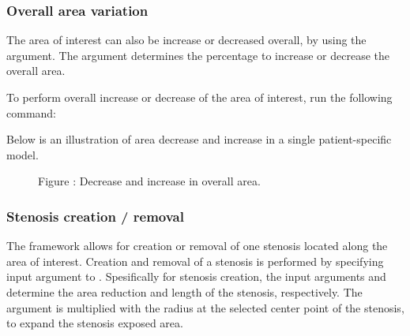 \documentclass[letterpaper,10pt,english]{sphinxmanual}
\begin{document}
\subsubsection{Overall area variation}
\label{\detokenize{getting_started:overall-area-variation}}
The area of interest can also be increase or decreased overall, by using the  argument.
The  argument determines the percentage to increase or decrease the overall area.

To perform overall increase or decrease of the area of interest, run the following command:

%
\begin{sphinxVerbatim}[commandchars=\\\{\}]
   \PYG{p}{[}\PYG{p}{]}  \PYG{p}{[}\PYG{p}{]}    \PYG{p}{[}\PYG{p}{]}
\end{sphinxVerbatim}

Below is an illustration of area decrease and increase in a single patient-specific model.

\begin{figure}[htbp]
\centering
\capstart

\noindent{}
\caption{Figure : Decrease and increase in overall area.}\label{\detokenize{getting_started:id8}}\end{figure}


\subsubsection{Stenosis creation / removal}
\label{\detokenize{getting_started:stenosis-creation-removal}}
The framework allows for creation or removal of one stenosis located along the area of interest.
Creation and removal of a stenosis is performed by specifying input argument  to .
Spesifically for stenosis creation, the input arguments  and  determine the area reduction and length of the stenosis, respectively.
The  argument is multiplied with the radius at the selected center point of the stenosis, to expand the stenosis exposed area.
\end{document}
